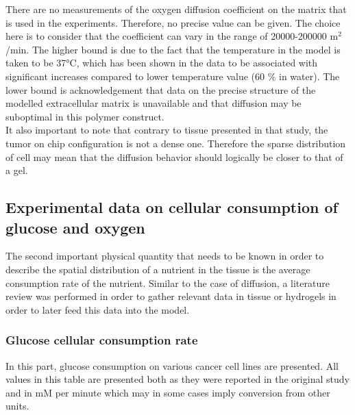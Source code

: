 \documentclass[11pt,a4paper]{article}
\begin{document}
There are no measurements of the oxygen diffusion coefficient on the matrix that is used in the experiments. Therefore, no precise value can be given. The choice here is to consider that the coefficient can vary in the range of 20000-200000 \textmu m$^2$/min. The higher bound is due to the fact that the temperature in the model is taken to be 37°C, which has been shown in the data to be associated with significant increases compared to lower temperature value (60 \% in water). The lower bound is acknowledgement that data on the precise structure of the modelled extracellular matrix is unavailable and that diffusion may be suboptimal in this polymer construct.\\

It also important to note that contrary to tissue presented in that study, the tumor on chip configuration is not a dense one. Therefore the sparse distribution of cell may mean that the diffusion behavior should logically be closer to that of a gel.\\


\subsection{Experimental data on cellular consumption of glucose and oxygen}
The second important physical quantity that needs to be known in order to describe the spatial distribution of a nutrient in the tissue is the average consumption rate of the nutrient. Similar to the case of diffusion, a literature review was performed in order to gather relevant data in tissue or hydrogels in order to later feed this data into the model.\\

\subsubsection{Glucose cellular consumption rate}

In this part, glucose consumption on various cancer cell lines are presented. All values in this table are presented both as they were reported in the original study and  in mM per minute which may in some cases imply conversion from other units.
\end{document}

